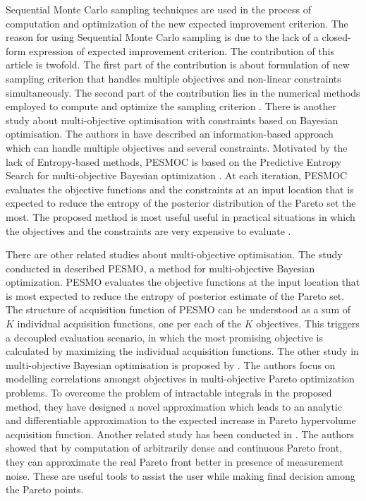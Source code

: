 Sequential Monte Carlo sampling techniques are used in the process of computation and optimization of the new expected improvement criterion. The reason for using Sequential Monte Carlo sampling  is due to the lack of a closed-form expression of expected improvement criterion.
The contribution of this article is twofold. The first part of the contribution is about formulation of new sampling criterion that handles multiple objectives and non-linear constraints simultaneously.  The second part of the contribution lies in the numerical methods employed to compute and optimize the sampling criterion \cite{feliot2017bayesian}. 
There is another study about multi-objective optimisation with constraints based on Bayesian optimisation. The authors in \cite{garrido2016predictive} have described an information-based approach which can handle multiple objectives and several constraints. Motivated by the lack of Entropy-based methods, PESMOC is based on the Predictive Entropy Search for multi-objective Bayesian optimization \cite{hernandez2016predictive}. At each iteration, PESMOC evaluates the objective functions and the constraints at an input location that is expected to reduce the entropy of the posterior distribution of the Pareto set the most. The proposed method is most useful useful in practical situations in which the objectives and the constraints are very
expensive to evaluate \cite{garrido2016predictive}.
\par
There are other related studies about multi-objective optimisation. The study conducted in \cite{hernandez2016predictive} described PESMO, a method for multi-objective Bayesian optimization. PESMO evaluates the objective functions at the input location that is most expected to reduce the entropy of posterior estimate of the Pareto set. The structure of acquisition function of PESMO can be understood as a sum of $K$ individual acquisition functions, one per each of the $K$ objectives. This triggers a decoupled evaluation scenario, in which the most promising objective is calculated by maximizing the individual acquisition functions.
The other study in multi-objective Bayesian optimisation is proposed by \cite{shah2016pareto}. The authors focus on modelling correlations amongst objectives in multi-objective Pareto optimization problems. To overcome the problem of intractable integrals in the proposed method, they have designed a novel approximation which leads to an analytic and differentiable approximation to the expected increase in Pareto hypervolume acquisition function.
Another related study has been conducted in \cite{calandra2014pareto}. The authors showed that by computation of arbitrarily dense and continuous Pareto front, they can approximate the real Pareto front better in presence of measurement noise. These are useful tools to assist the user while making final decision among the Pareto points.
